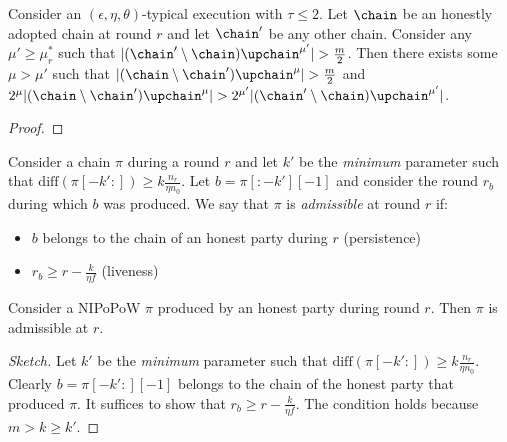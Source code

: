 \begin{lemma}
  Consider an $(\epsilon, \eta, \theta)$-typical execution with $\tau \leq 2$.
  Let $\chain$ be an honestly adopted chain at round $r$ and let $\chain'$ be
  any other chain. Consider any $\mu' \geq \mu^*_r$ such that
  $|(\chain'\setminus\chain)\upchain^{\mu'}| > \frac{m}{2}$. Then there exists
  some $\mu > \mu'$ such that $|(\chain\setminus\chain')\upchain^\mu| >
  \frac{m}{2}$ and $2^\mu|(\chain\setminus\chain')\upchain^\mu| >
  2^{\mu'}|(\chain'\setminus\chain)\upchain^{\mu'}|$.
\end{lemma}
\ifdraft
\begin{proof}
\end{proof}
\fi

\begin{definition}
  Consider a chain $\pi$ during a round $r$ and let $k'$
  be the \emph{minimum} parameter such that
  $\text{diff}(\pi[-k':]) \geq k \frac{n_r}{\eta n_0}$.
  Let $b = \pi[:-k'][-1]$ and consider the round $r_b$ during
  which $b$ was produced.
  We say that $\pi$ is \emph{admissible} at round $r$ if:
  \begin{itemize}
    \item $b$ belongs to the chain of an honest party during $r$ (persistence)
    \item $r_b \geq r - \frac{k}{\eta f}$ (liveness)
  \end{itemize}
\end{definition}

\begin{lemma}\label{lem:honest-chop}
  Consider a NIPoPoW $\pi$ produced by an honest party during round $r$.
  Then $\pi$ is admissible at $r$.
\end{lemma}
\begin{proof}[Sketch]
  Let $k'$
  be the \emph{minimum} parameter such that
  $\text{diff}(\pi[-k':]) \geq k \frac{n_r}{\eta n_0}$.
  Clearly $b = \pi[-k':][-1]$ belongs to the chain of the honest party that
  produced $\pi$. It suffices to show that $r_b \geq r - \frac{k}{\eta f}$.
  The condition holds because $m > k \geq k'$.
\end{proof}

